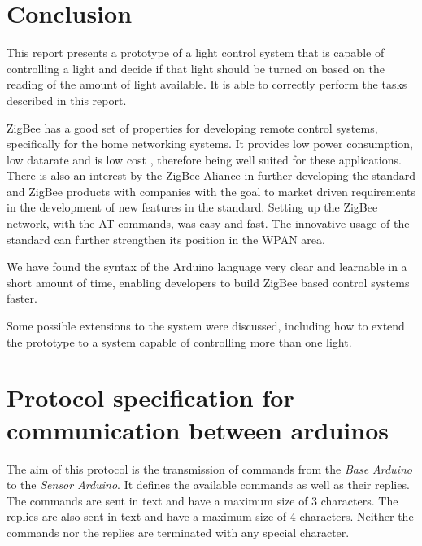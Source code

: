 \documentclass[conference, a4paper]{IEEEtran}
\begin{document}
\section{Conclusion}
\label{conc}

This report presents a prototype of a light control system that is capable of controlling a light and decide if that light should be turned on based on the reading of the amount of light available. It is able to correctly perform the tasks described in this report.

ZigBee has a good set of properties for developing remote control systems, specifically for the home networking systems. It provides low power consumption, low datarate and is low cost \cite{lee2013experimental}, therefore being well suited for these applications. There is also an interest by the ZigBee Aliance in further developing the standard and ZigBee products with companies with the goal to market driven requirements in the development of new features in the standard. \cite{2_the_zigbee_alliance} Setting up the ZigBee network, with the AT commands, was easy and fast. The innovative usage of the standard can further strengthen its position in the WPAN area.

We have found the syntax of the Arduino language very clear and learnable in a short amount of time, enabling developers to build ZigBee based control systems faster.

Some possible extensions to the system were discussed, including how to extend the prototype to a system capable of controlling more than one light.




\clearpage
\setcounter{page}{1}

\appendices

\section{Protocol specification for communication between arduinos}
\label{prot_ard}

The aim of this protocol is the transmission of commands from the \textit{Base Arduino} to the \textit{Sensor Arduino}. It defines the available commands as well as their replies. The commands are sent in text and have a maximum size of 3 characters. The replies are also sent in text and have a maximum size of 4 characters. Neither the commands nor the replies are terminated with any special character.
\end{document}
